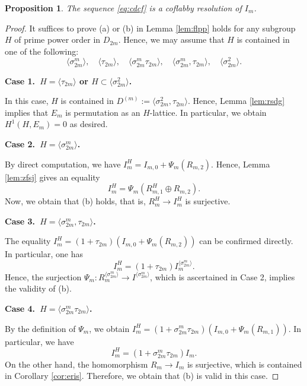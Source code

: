 \documentclass[10pt,a4paper]{amsart}
\newtheorem{prop}{Proposition}
\begin{document}
\begin{prop}\label{prop:cfcf}
The sequence \eqref{eq:cdcf} is a coflabby resolution of $I_{m}$. 
\end{prop}

\begin{proof}
It suffices to prove (a) or (b) in Lemma \ref{lem:flpp} holds for any subgroup $H$ of prime power order in $D_{2m}$. Hence, we may assume that $H$ is contained in one of the following: 
\begin{equation*}
\langle \sigma_{2m}^{m}\rangle,\quad \langle \tau_{2m}\rangle,\quad \langle \sigma_{2m}^{m}\tau_{2m}\rangle,\quad \langle \sigma_{2m}^{m},\tau_{2m}\rangle,\quad \langle \sigma_{2m}^{2}\rangle. 
\end{equation*}

\textbf{Case 1.~$H=\langle \tau_{2m}\rangle$ or $H\subset \langle \sigma_{2m}^{2}\rangle$. }

In this case, $H$ is contained in $D^{(m)}:=\langle \sigma_{2m}^{2},\tau_{2m}\rangle$. Hence, Lemma \ref{lem:rsdg} implies that $E_{m}$ is permutation as an $H$-lattice. In particular, we obtain $H^{1}(H,E_{m})=0$ as desired. 

\textbf{Case 2.~$H=\langle \sigma_{2m}^{m}\rangle$. }

By direct computation, we have $I_{m}^{H}=I_{m,0}+\Psi_{m}(R_{m,2})$. Hence, Lemma \ref{lem:zfsj} gives an equality
\begin{equation*}
    I_{m}^{H}=\Psi_{m}(R_{m,1}^{H}\oplus R_{m,2}). 
\end{equation*}
Now, we obtain that (b) holds, that is, $R_{m}^{H}\rightarrow I_{m}^{H}$ is surjective. 

\textbf{Case 3.~$H=\langle \sigma_{2m}^{m},\tau_{2m}\rangle$. }

The equality $I_{m}^{H}=(1+\tau_{2m})(I_{m,0}+\Psi_{m}(R_{m,2}))$ can be confirmed directly. In particular, one has 
\begin{equation*}
    I_{m}^{H}=(1+\tau_{2m})I_{m}^{\langle \sigma_{2m}^{m}\rangle}. 
\end{equation*}
Hence, the surjection $\Psi_{m}\colon R_{m}^{\langle \sigma_{2m}^{m}\rangle}\rightarrow I^{\langle \sigma_{2m}^{m}\rangle}$, which is  ascertained in Case 2, implies the validity of (b). 

\textbf{Case 4.~$H=\langle \sigma_{2m}^{m}\tau_{2m}\rangle$. }

By the definition of $\Psi_{m}$, we obtain $I_{m}^{H}=(1+\sigma_{2m}^{m}\tau_{2m})(I_{m,0}+\Psi_{m}(R_{m,1}))$. In particular, we have
\begin{equation*}
    I_{m}^{H}=(1+\sigma_{2m}^{m}\tau_{2m})I_{m}. 
\end{equation*}
On the other hand, the homomorphism $R_{m}\rightarrow I_{m}$ is surjective, which is contained in Corollary \ref{cor:eris}. Therefore, we obtain that (b) is valid in this case.  
\end{proof}
\end{document}
